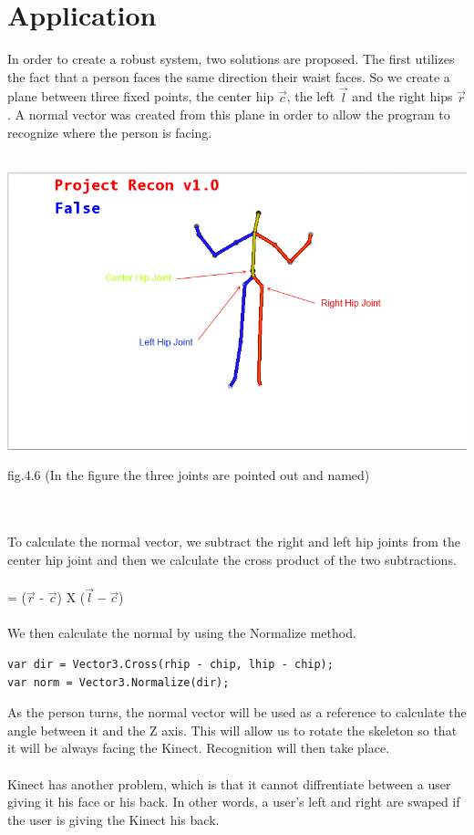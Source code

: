 \chapter{Application}\label{chap:application}
In order to create a robust system, two solutions are proposed. The first utilizes the fact that a person faces 
the same direction their waist faces. So we create a plane between three fixed 
points, the center hip $\vec{c}$, the left $\vec{l}$ and the right hips $\vec{r}$. A normal vector \N was created 
from this plane in order to allow the program to recognize where the person is 
facing. 
\\
\\
\centerline{\includegraphics[scale=0.5]{skeleton_frame3.png}}
\centerline{fig.4.6 (In the figure the three joints are pointed out and named)}
\\
\\
To calculate the normal vector, we subtract the right and left hip joints from 
the center hip joint and then we calculate the cross product of the two 
subtractions.
\\
\\
\N = ($\vec{r}$ - $\vec{c}$) X ($\vec{l} - \vec{c}$)
\\
\\
We then calculate the normal by using the Normalize method.
\begin{verbatim}
var dir = Vector3.Cross(rhip - chip, lhip - chip);
var norm = Vector3.Normalize(dir);
\end{verbatim}
As the person turns, the normal vector will be used as a reference to calculate the angle between it and the Z axis. This will allow us to rotate the skeleton so that it will be always facing the Kinect. Recognition will then take place.
\\
\\
Kinect has another problem, which is that it cannot diffrentiate between a user giving it his face or his back. In other words, a user's left and right are swaped if the user is giving the Kinect his back.

